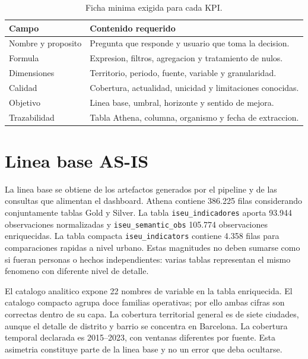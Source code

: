 \begin{table}[H]
\centering
\caption{Ficha minima exigida para cada KPI.}
\label{tab:ficha-kpi}
\begin{tabularx}{\textwidth}{p{}X}
\toprule
\textbf{Campo} & \textbf{Contenido requerido} \\
\midrule
Nombre y proposito & Pregunta que responde y usuario que toma la decision. \\
Formula & Expresion, filtros, agregacion y tratamiento de nulos. \\
Dimensiones & Territorio, periodo, fuente, variable y granularidad. \\
Calidad & Cobertura, actualidad, unicidad y limitaciones conocidas. \\
Objetivo & Linea base, umbral, horizonte y sentido de mejora. \\
Trazabilidad & Tabla Athena, columna, organismo y fecha de extraccion. \\
\bottomrule
\end{tabularx}
\end{table}

\section{Linea base AS-IS}

La linea base se obtiene de los artefactos generados por el pipeline y de las consultas que alimentan el dashboard. Athena contiene 386.225 filas considerando conjuntamente tablas Gold y Silver. La tabla \texttt{iseu\_indicadores} aporta 93.944 observaciones normalizadas y \texttt{iseu\_semantic\_obs} 105.774 observaciones enriquecidas. La tabla compacta \texttt{iseu\_indicators} contiene 4.358 filas para comparaciones rapidas a nivel urbano. Estas magnitudes no deben sumarse como si fueran personas o hechos independientes: varias tablas representan el mismo fenomeno con diferente nivel de detalle.

El catalogo analitico expone 22 nombres de variable en la tabla enriquecida. El catalogo compacto agrupa doce familias operativas; por ello ambas cifras son correctas dentro de su capa. La cobertura territorial general es de siete ciudades, aunque el detalle de distrito y barrio se concentra en Barcelona. La cobertura temporal declarada es 2015--2023, con ventanas diferentes por fuente. Esta asimetria constituye parte de la linea base y no un error que deba ocultarse.

